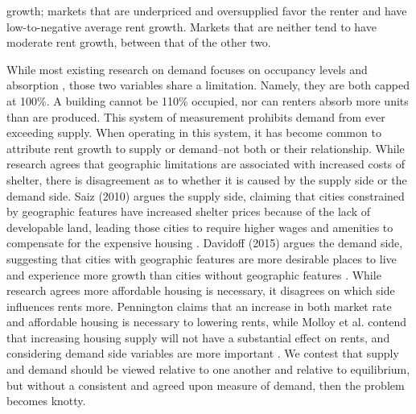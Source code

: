 \documentclass[sn-mathphys-num]{sn-jnl}%
\theoremstyle{thmstyleone}%
\theoremstyle{thmstyletwo}%
\theoremstyle{thmstylethree}%
\begin{document}
growth; markets that are underpriced and oversupplied favor the renter and have low-to-negative average rent growth. Markets that are neither tend to have moderate rent growth, between that of the other two. 

While most existing research on demand focuses on occupancy levels and absorption \cite{anenberg2024volatility} \cite{pyhrr1999real} \cite{mueller1999real}, those two variables share a limitation. Namely, they are both capped at 100\%. A building cannot be 110\% occupied, nor can renters absorb more units than are produced. This system of measurement prohibits demand from ever exceeding supply. When operating in this system, it has become common to attribute rent growth to supply or demand--not both or their relationship. While research agrees that geographic limitations are associated with increased costs of shelter, there is disagreement as to whether it is caused by the supply side or the demand side. Saiz (2010) argues the supply side, claiming that cities constrained by geographic features have increased shelter prices because of the lack of developable land, leading those cities to require higher wages and amenities to compensate for the expensive housing \cite{saiz2010geographic}. Davidoff (2015) argues the demand side, suggesting that cities with geographic features are more desirable places to live and experience more growth than cities without geographic features \cite{davidoff2015supply}. While research agrees more affordable housing is necessary, it disagrees on which side influences rents more. Pennington claims that an increase in both market rate and affordable housing is necessary to lowering rents, while Molloy et al. contend that increasing housing supply will not have a substantial effect on rents, and considering demand side variables are more important \cite{pennington2021does} \cite{molloy2022housing}. We contest that supply and demand should be viewed relative to one another and relative to equilibrium, but without a consistent and agreed upon measure of demand, then the problem becomes knotty. 
\end{document}
